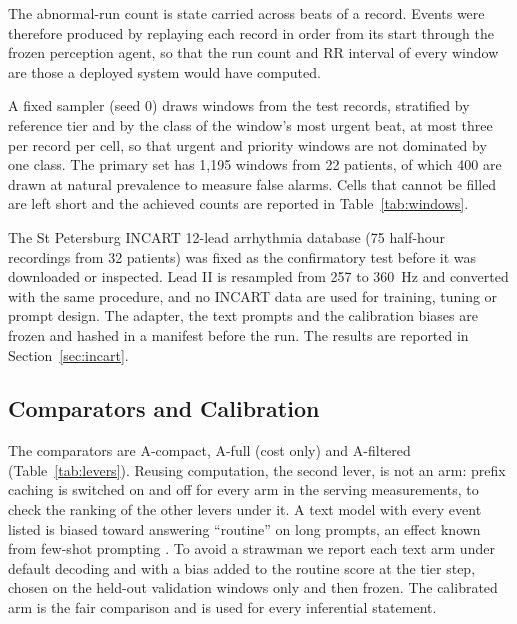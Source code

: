  The abnormal-run count is state carried across beats of a record. Events were therefore produced by replaying each record in order from its start through the frozen perception agent, so that the run count and RR interval of every window are those a deployed system would have computed.

 A fixed sampler (seed 0) draws windows from the test records, stratified by reference tier and by the class of the window's most urgent beat, at most three per record per cell, so that urgent and priority windows are not dominated by one class. The primary set has 1,195 windows from 22 patients, of which 400 are drawn at natural prevalence to measure false alarms. Cells that cannot be filled are left short and the achieved counts are reported in Table~\ref{tab:windows}.

\begin{table}[t]
\caption{Test windows by number of events per prompt $N$ and reference tier (primary DS2 set, 22 records). Stratified windows are drawn per tier; natural-prevalence windows are drawn without stratification and measure false alarms at real tier frequencies. Cells shorter than their quota (for example priority at $N=50$) are those the test records could not fill.}
\label{tab:windows}
\centering
\footnotesize
{}
\end{table}

 The St Petersburg INCART 12-lead arrhythmia database \cite{goldberger2000physionet} (75 half-hour recordings from 32 patients) was fixed as the confirmatory test before it was downloaded or inspected. Lead II is resampled from 257 to 360~Hz and converted with the same procedure, and no INCART data are used for training, tuning or prompt design. The adapter, the text prompts and the calibration biases are frozen and hashed in a manifest before the run. The results are reported in Section~\ref{sec:incart}.

\subsection{Comparators and Calibration}
The comparators are A-compact, A-full (cost only) and A-filtered (Table~\ref{tab:levers}). Reusing computation, the second lever, is not an arm: prefix caching is switched on and off for every arm in the serving measurements, to check the ranking of the other levers under it. A text model with every event listed is biased toward answering ``routine'' on long prompts, an effect known from few-shot prompting \cite{zhao2021calibrate}. To avoid a strawman we report each text arm under default decoding and with a bias added to the routine score at the tier step, chosen on the held-out validation windows only and then frozen. The calibrated arm is the fair comparison and is used for every inferential statement.

